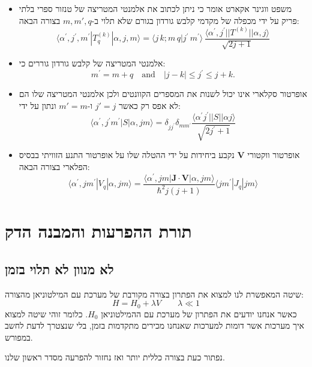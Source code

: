 \documentclass{tstextbook}
\begin{document}
\begin{summary}
  \begin{itemize}
    \item משפט ווגינר אקארט אומר כי ניתן לכתוב את אלמנטי המטריצה של טנזור ספרי בלתי פריק על ידי מכפלה של מקדמי קלבש גורדון בגורם שלא תלוי ב-\(m,m',q\) בצורה הבאה:
$$\langle\alpha^{\prime},j^{\prime},m^{\prime}|T_{q}^{(k)}|\alpha,j,m\rangle=\langle j\,k;m\,q|j^{\prime}\,m^{\prime}\rangle\,\frac{\langle\alpha^{\prime},j^{\prime}||T^{(k)}||\alpha,j\rangle}{\sqrt{2j+1}}$$
    \item אלמנטי המטריצה של קלבש גורדון גוררים כי:
$$m^{\prime}=m+q\quad\mathrm{and}\quad|j-k|\leq j^{\prime}\leq j+k.$$
    \item אופרטור סקלארי אינו יכול לשנות את המספרים הקוונטים ולכן אלמנטי המטריצה שלו הם לא אפס רק כאשר \(j'=j\) ו-\(m'=m\) ונתון על ידי:
 $$\langle\alpha^{\prime},j^{\prime}m^{\prime}|S|\alpha,j m\rangle=\delta_{j j^{\prime}}\delta_{m m^{\prime}}\frac{\langle\alpha^{\prime}j^{\prime}||S||\alpha j\rangle}{\sqrt{2j^{\prime}+1}}$$
    \item אופרטור ווקטורי \(\mathbf{V}\) נקבע ביחידות על ידי ההטלה שלו על אופרטור התנע הזוויתי בבסיס הפלארי בצורה הבאה:
 $$\langle\alpha^{\prime},j m^{\prime}|V_{q}|\alpha,j m\rangle=\frac{\langle\alpha^{\prime},j m|\mathbf{J}\cdot\mathbf{V}|\alpha,j m\rangle}{\hbar^{2}j(j+1)}\langle j m^{\prime}|J_{q}|j m\rangle$$
  \end{itemize}
\end{summary}
\chapter{תורת ההפרעות והמבנה הדק}

\section{לא מנוון לא תלוי בזמן}

\begin{definition}
שיטה המאפשרת לנו למצוא את הפתרון בצורה מקורבת של מערכת עם המילטוניאן מהצורה:
$$H= H_{0}+\lambda V\qquad \lambda\ll 1$$
כאשר אנחנו יודעים את הפתרון של מערכת עם ההמילטוניאן \(H_{0}\). כלומר זוהי שיטה למצוא איך מערכות אשר דומות למערכות שאנחנו מכירים מתקדמות בזמן, בלי שנצטרך לדעת לחשב במפורש.

\end{definition}
נפתור כעת בצורה כללית יותר ואז נחזור להפרעה מסדר ראשון שלנו.
\end{document}
